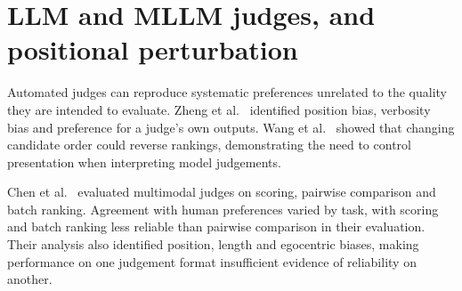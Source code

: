 
\section{LLM and MLLM judges, and positional perturbation}\label{sec:bg-judges}

Automated judges can reproduce systematic preferences unrelated to the
quality they are intended to evaluate. Zheng et al.\ \cite{zheng2023judging}
identified position bias, verbosity bias and preference for a judge's own
outputs. Wang et al.\ \cite{wang2024fair} showed that changing candidate
order could reverse rankings, demonstrating the need to control presentation
when interpreting model judgements.

Chen et al.\ \cite{chen2024mllmjudge} evaluated multimodal judges on scoring,
pairwise comparison and batch ranking. Agreement with human preferences
varied by task, with scoring and batch ranking less reliable than pairwise
comparison in their evaluation. Their analysis also identified position,
length and egocentric biases, making performance on one judgement format
insufficient evidence of reliability on another.

